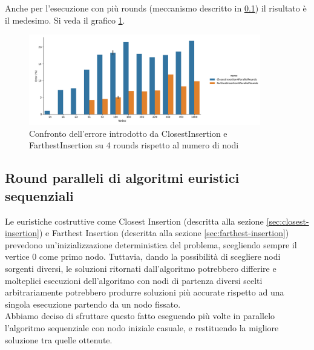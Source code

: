 \noindent Anche per l'esecuzione con più rounds (meccanismo descritto
in \ref{sec:rounds}) il risultato è il medesimo. Si veda il grafico
\ref{fig:closest-farthest-insertion-4-rounds-accuracy-error}.\\

\begin{figure}[H]
    \centering

    \includegraphics[width=0.9\textwidth]{./images/ClosestInsertion4ParallelRounds_vs_FarthestInsertion4ParallelRounds__approximation_error_.png}

    \caption{Confronto dell'errore introdotto da ClosestInsertion e FarthestInsertion su 4 rounds rispetto al numero di nodi}
    \label{fig:closest-farthest-insertion-4-rounds-accuracy-error}
\end{figure}

\subsection{Round paralleli di algoritmi euristici sequenziali}
\label{sec:rounds}

\noindent Le euristiche costruttive come Closest Insertion (descritta alla sezione
\ref{sec:closest-insertion}) e Farthest Insertion (descritta alla
sezione \ref{sec:farthest-insertion}) prevedono un'inizializzazione
deterministica del problema, scegliendo sempre il vertice
$0$ come primo nodo. Tuttavia, dando la possibilità di scegliere nodi sorgenti diversi, le soluzioni ritornati dall'algoritmo potrebbero differire e molteplici esecuzioni dell'algoritmo con nodi di partenza diversi scelti arbitrariamente potrebbero produrre soluzioni più
accurate rispetto ad una singola esecuzione partendo da un nodo fissato.\\

\noindent Abbiamo deciso di sfruttare questo fatto eseguendo più volte in parallelo l'algoritmo sequenziale con nodo iniziale casuale, e restituendo la migliore soluzione tra quelle ottenute. \\

